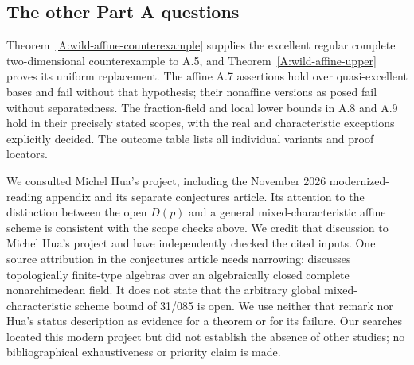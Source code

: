 \subsection{The other Part A questions}
Theorem~\ref{A:wild-affine-counterexample} supplies the excellent
regular complete two-dimensional counterexample to A.5, and
Theorem~\ref{A:wild-affine-upper} proves its uniform replacement.
The affine A.7 assertions hold over quasi-excellent bases and
fail without that hypothesis; their nonaffine versions as posed
fail without separatedness. The fraction-field and local lower
bounds in A.8 and A.9 hold in their precisely stated scopes,
with the real and characteristic exceptions explicitly decided.
The outcome table lists all individual variants and proof locators.

\begin{remark}
We consulted Michel Hua's project, including the November 2026
modernized-reading appendix \citep[pp.~42--43]{A_Hua2026} and its
separate conjectures article. Its attention to the distinction between
the open $D(p)$ and a general mixed-characteristic affine scheme is
consistent with the scope checks above. We credit that discussion to
Michel Hua's project and have independently checked the cited inputs.
One source attribution in the conjectures article needs narrowing:
\citet[Remark 7.4]{A_BhattMathew2020} discusses topologically finite-type
algebras over an algebraically closed complete nonarchimedean field.
It does not state that the arbitrary global mixed-characteristic
scheme bound of 31/085 is open. We use neither that remark nor Hua's
status description as evidence for a theorem or for its failure.
Our searches located this modern project but did not establish the
absence of other studies; no bibliographical exhaustiveness or
priority claim is made.
\end{remark}

